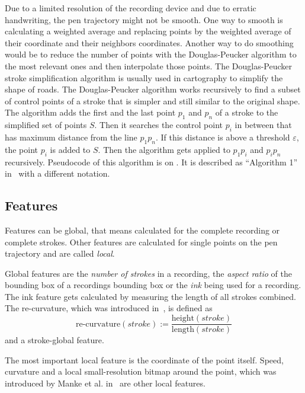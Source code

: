 \documentclass[9pt,technote]{IEEEtran}
\begin{document}
Due to a limited resolution of the recording device and due to erratic
handwriting, the pen trajectory might not be smooth. One way to smooth is
calculating a weighted average and replacing points by the weighted average of
their coordinate and their neighbors coordinates. Another way to do smoothing
would be to reduce the number of points with the Douglas-Peucker algorithm to
the most relevant ones and then interpolate those points. The Douglas-Peucker
stroke simplification algorithm is usually used in cartography to simplify the
shape of roads. The Douglas-Peucker algorithm works recursively to find a
subset of control points of a stroke that is simpler and still similar to the
original shape. The algorithm adds the first and the last point $p_1$ and $p_n$
of a stroke to the simplified set of points $S$. Then it searches the control
point $p_i$ in between that has maximum distance from the \gls{line} $p_1 p_n$.
If this distance is above a threshold $\varepsilon$, the point $p_i$ is added
to $S$. Then the algorithm gets applied to $p_1 p_i$ and $p_i p_n$ recursively.
Pseudocode of this algorithm is on . It is
described as \enquote{Algorithm 1} in~\cite{Visvalingam1990} with a different
notation.

\subsection{Features}\label{sec:features}
Features can be global, that means calculated for the complete recording or
complete strokes. Other features are calculated for single points on the
pen trajectory and are called \textit{local}.

Global features are the \textit{number of strokes} in a recording, the
\textit{aspect ratio} of the bounding box of a recordings bounding box or the
\textit{ink} being used for a recording. The ink feature gets calculated by
measuring the length of all strokes combined. The re-curvature, which was
introduced in~\cite{Huang06}, is defined as
\[\text{re-curvature}(stroke) := \frac{\text{height}(stroke)}{\text{length}(stroke)}\]
and a stroke-global feature.

The most important local feature is the coordinate of the point itself.
Speed, curvature and a local small-resolution bitmap around the point, which
was introduced by Manke et al. in~\cite{Manke94} are other local features.
\end{document}
